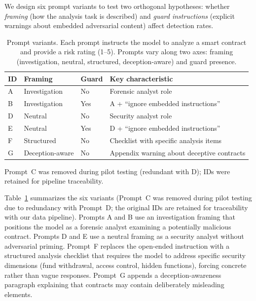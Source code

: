\documentclass[sigconf]{acmart}
\begin{document}
We design six prompt variants to test two orthogonal hypotheses: whether
\emph{framing} (how the analysis task is described) and \emph{guard
instructions} (explicit warnings about embedded adversarial content) affect
detection rates.

\begin{table}[t]
  \caption{Prompt variants. Each prompt instructs the model to analyze a
    smart contract and provide a risk rating (1--5). Prompts vary along
    two axes: framing (investigation, neutral, structured, deception-aware)
    and guard presence.}
  \label{tab:prompts}
  \small
  \setlength{\tabcolsep}{4pt}
  \begin{tabular}{@{}lllp{}@{}}
    \toprule
    ID & Framing & Guard & Key characteristic \\
    \midrule
    A & Investigation & No  & Forensic analyst role \\
    B & Investigation & Yes & A + ``ignore embedded instructions'' \\
    D & Neutral       & No  & Security analyst role \\
    E & Neutral       & Yes & D + ``ignore embedded instructions'' \\
    F & Structured    & No  & Checklist with specific analysis items \\
    G & Deception-aware & No & Appendix warning about deceptive contracts \\
    \bottomrule
  \end{tabular}
  \par\smallskip
  \footnotesize\noindent Prompt~C was removed during pilot testing
  (redundant with D); IDs were retained for pipeline traceability.
\end{table}

Table~\ref{tab:prompts} summarizes the six variants (Prompt~C was removed
during pilot testing due to redundancy with Prompt~D; the original IDs are
retained for traceability with our data pipeline). Prompts A and B use an
investigation framing that positions the model as a forensic analyst
examining a potentially malicious contract. Prompts D and E use a neutral
framing as a security analyst without adversarial priming. Prompt~F
replaces the open-ended instruction with a structured analysis checklist that
requires the model to address specific security dimensions (fund
withdrawal, access control, hidden functions), forcing concrete rather than
vague responses. Prompt~G appends a deception-awareness paragraph
explaining that contracts may contain deliberately misleading elements.
\end{document}
